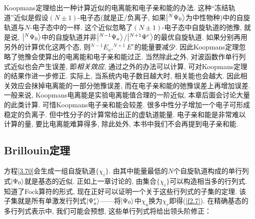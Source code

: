 Koopmans定理给出一种计算近似的电离能和电子亲和能的办法. 这种“冻结轨道”近似是假设$(N\pm1)$-电子态(就是正/负离子, 如果$\Ket{^N\Psi_0}$为中性物种)中的自旋轨道与$N$-电子态中的一样. 
这个近似忽略了$(N\pm1)$-电子态中自旋轨道的弛豫, 就是说, $\Ket{^N\Psi_0}$中的自旋轨道并非$\Ket{^{N-1}\Psi_a}$/$\Ket{^{N+1}\Psi^r}$的最优自旋轨道. 
如果分别再用另外的\hft 计算优化这两个态, 则$^{N-1}E_a,^{N+1}E^r$的能量要减少. 因此Koopmans定理忽略了弛豫会使算出的电离能和电子亲和能过正. 
当然除此之外, 对波函数作单行列式近似也会产生误差, 即\emph{相关效应}, 通过\hft 之外的办法可以计算, 可对Koopmans定理的结果作进一步修正. 
实际上, 当系统内电子数目越大时, 相关能也会越大. 
因此相关效应会抹掉电离能的一部分弛豫误差, 而在电子亲和能的弛豫误差上再增加误差. 
一般来说, Koopmans电离能是实验电离能值合理的一阶近似, 本章后面会讨论大量的此类计算. 
可惜Koopmans电子亲和能会较差. 很多中性分子增加一个电子可形成稳定的负离子. 
但中性分子的\hft 计算常给出正的虚轨道能量. 
电子亲和能是非常难以计算的量, 要比电离能难算得多, 除此处外, 本书中我们不会再提到电子亲和能.

\subsection{Brillouin定理}
\label{sec3.3.2}
\hft 方程\autoref{3.70}会生成一组自旋轨道$\{\chi_i\}$. 
由其中能量最低的$N$个自旋轨道构成的单行列式$\Ket{\Psi_0}$就是基态的\hft 近似. 
正如上一章讨论的, 由集合$\{\chi_i\}$可以构造相当多的行列式. 
知道了Fock算符的形式, 现在正好可以证明一个关于这些行列式的子集的定理. 
该子集就是所有单激发行列式$\Ket{\Psi_a^r}$——将$\Ket{\Psi_0}$中$\chi_a$换为$\chi_r$即得(\autoref{f2.7}). 
在精确基态的多行列式表示中, 我们可能会预想, 这些单行列式将给出领头阶修正：

